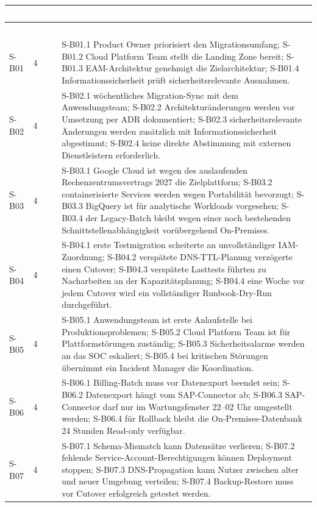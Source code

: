 \documentclass[
  10pt,
  ngerman,
  a4paper,
  toc=graduated,
  numbers=noenddot,
  headings=standardclasses,
  nonumberlist
]{scrartcl}
\begin{document}
\footnotesize
\begin{longtable}{L{1.2cm}C{1.1cm}L{12.7cm}}
\toprule
{}
\textcolor{white}{\textbf{ID}} & \textcolor{white}{\textbf{Anz.}} & \textcolor{white}{\textbf{Atomare Referenzfakten}}\\
\midrule
\endfirsthead
\toprule
{}
\textcolor{white}{\textbf{ID}} & \textcolor{white}{\textbf{Anz.}} & \textcolor{white}{\textbf{Atomare Referenzfakten}}\\
\midrule
\endhead
S-B01 & 4 & S-B01.1 Product Owner priorisiert den Migrationsumfang; S-B01.2 Cloud Platform Team stellt die Landing Zone bereit; S-B01.3 EAM-Architektur genehmigt die Zielarchitektur; S-B01.4 Informationssicherheit prüft sicherheitsrelevante Ausnahmen.\\
S-B02 & 4 & S-B02.1 wöchentliches Migration-Sync mit dem Anwendungsteam; S-B02.2 Architekturänderungen werden vor Umsetzung per ADR dokumentiert; S-B02.3 sicherheitsrelevante Änderungen werden zusätzlich mit Informationssicherheit abgestimmt; S-B02.4 keine direkte Abstimmung mit externen Dienstleistern erforderlich.\\
S-B03 & 4 & S-B03.1 Google Cloud ist wegen des auslaufenden Rechenzentrumsvertrags 2027 die Zielplattform; S-B03.2 containerisierte Services werden wegen Portabilität bevorzugt; S-B03.3 BigQuery ist für analytische Workloads vorgesehen; S-B03.4 der Legacy-Batch bleibt wegen einer noch bestehenden Schnittstellenabhängigkeit vorübergehend On-Premises.\\
S-B04 & 4 & S-B04.1 erste Testmigration scheiterte an unvollständiger IAM-Zuordnung; S-B04.2 verspätete DNS-TTL-Planung verzögerte einen Cutover; S-B04.3 verspätete Lasttests führten zu Nacharbeiten an der Kapazitätsplanung; S-B04.4 eine Woche vor jedem Cutover wird ein vollständiger Runbook-Dry-Run durchgeführt.\\
S-B05 & 4 & S-B05.1 Anwendungsteam ist erste Anlaufstelle bei Produktionsproblemen; S-B05.2 Cloud Platform Team ist für Plattformstörungen zuständig; S-B05.3 Sicherheitsalarme werden an das SOC eskaliert; S-B05.4 bei kritischen Störungen übernimmt ein Incident Manager die Koordination.\\
S-B06 & 4 & S-B06.1 Billing-Batch muss vor Datenexport beendet sein; S-B06.2 Datenexport hängt vom SAP-Connector ab; S-B06.3 SAP-Connector darf nur im Wartungsfenster 22--02 Uhr umgestellt werden; S-B06.4 für Rollback bleibt die On-Premises-Datenbank 24 Stunden Read-only verfügbar.\\
S-B07 & 4 & S-B07.1 Schema-Mismatch kann Datensätze verlieren; S-B07.2 fehlende Service-Account-Berechtigungen können Deployment stoppen; S-B07.3 DNS-Propagation kann Nutzer zwischen alter und neuer Umgebung verteilen; S-B07.4 Backup-Restore muss vor Cutover erfolgreich getestet werden.\\

\end{longtable}
\end{document}
